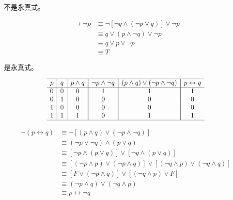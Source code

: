 {{\begin{practices}
            不是永真式。
        \end{practices}

        \begin{practices}
            \begin{align*}
                [\neg q \wedge (p \rightarrow q)] \rightarrow \neg p
                &\equiv \neg [\neg q \wedge (\neg p \vee q)] \vee \neg p \\
                &\equiv q \vee (p \wedge \neg q) \vee \neg p \\
                &\equiv q \vee p \vee \neg p \\
                &\equiv T
            \end{align*}

            是永真式。
        \end{practices}

        \begin{practices}
            \begin{table}[H]
                \[
                    \begin{array}{c|c|c|c|c|c}
                        \hline
                        p & q & p \wedge q & \neg p \wedge \neg q & (p \wedge q) \vee (\neg p \wedge \neg q) & p \leftrightarrow q \\
                        \hline
                        0 & 0 & 0 & 1 & 1 & 1 \\
                        0 & 1 & 0 & 0 & 0 & 0 \\
                        1 & 0 & 0 & 0 & 0 & 0 \\
                        1 & 1 & 1 & 0 & 1 & 1 \\
                        \hline
                   \end{array}
               \]
            \end{table}
        \end{practices}

        \begin{practices}
            \begin{align*}
                \neg (p \leftrightarrow q)
                &\equiv \neg [(p \wedge q) \vee (\neg p \wedge \neg q)] \\
                &\equiv (\neg p \vee \neg q) \wedge (p \vee q) \\
                &\equiv [\neg p \wedge (p \vee q)] \vee [\neg q \wedge (p \vee q)] \\
                &\equiv [(\neg p \wedge p) \vee (\neg p \wedge q)] \vee [(\neg q \wedge p) \vee (\neg q \wedge q)] \\
                &\equiv [F \vee (\neg p \wedge q)] \vee [(\neg q \wedge p) \vee F] \\
                &\equiv (\neg p \wedge q) \vee (\neg q \wedge p) \\
                &\equiv p \leftrightarrow \neg q
            \end{align*}
        \end{practices}

}}
